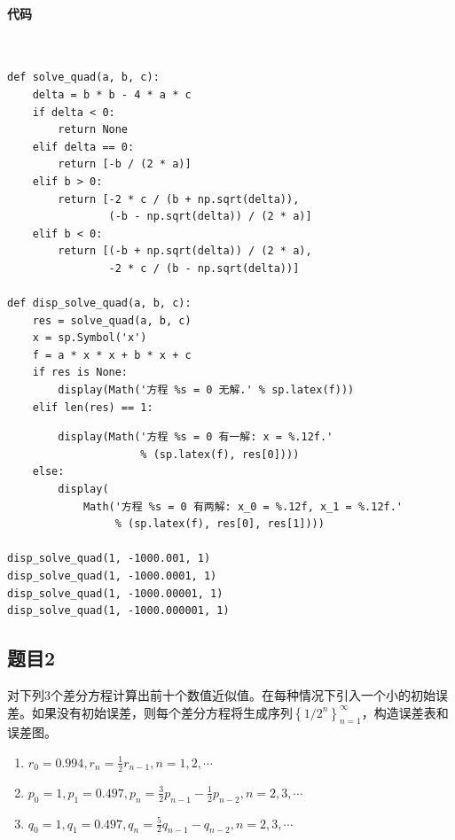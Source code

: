 \paragraph{代码}
~\\[.5em]
\begin{verbatim}
def solve_quad(a, b, c):
    delta = b * b - 4 * a * c
    if delta < 0:
        return None 
    elif delta == 0:
        return [-b / (2 * a)]
    elif b > 0:
        return [-2 * c / (b + np.sqrt(delta)),
                (-b - np.sqrt(delta)) / (2 * a)]
    elif b < 0:
        return [(-b + np.sqrt(delta)) / (2 * a),
                -2 * c / (b - np.sqrt(delta))]

def disp_solve_quad(a, b, c):
    res = solve_quad(a, b, c)
    x = sp.Symbol('x')
    f = a * x * x + b * x + c
    if res is None:
        display(Math('方程 %s = 0 无解.' % sp.latex(f)))
    elif len(res) == 1:
\end{verbatim}

\begin{verbatim}
        display(Math('方程 %s = 0 有一解: x = %.12f.' 
                     % (sp.latex(f), res[0])))
    else:
        display(
            Math('方程 %s = 0 有两解: x_0 = %.12f, x_1 = %.12f.'
                 % (sp.latex(f), res[0], res[1])))

disp_solve_quad(1, -1000.001, 1)
disp_solve_quad(1, -1000.0001, 1)
disp_solve_quad(1, -1000.00001, 1)
disp_solve_quad(1, -1000.000001, 1)
\end{verbatim}

\subsection{题目2}

对下列3个差分方程计算出前十个数值近似值。在每种情况下引入一个小的初始误差。如果没有初始误差，则每个差分方程将生成序列$\left\{1/2^n\right\}_{n=1}^\infty$，构造误差表和误差图。

\begin{enumerate}
	\item $r_0=0.994,r_n=\frac{1}{2}r_{n-1},n=1,2,\cdots$
	\item $p_0=1,p_1=0.497,p_n=\frac{3}{2}p_{n-1}-\frac{1}{2}p_{n-2},n=2,3,\cdots$
	\item $q_0=1,q_1=0.497,q_n=\frac{5}{2}q_{n-1}-q_{n-2},n=2,3,\cdots$
\end{enumerate}

